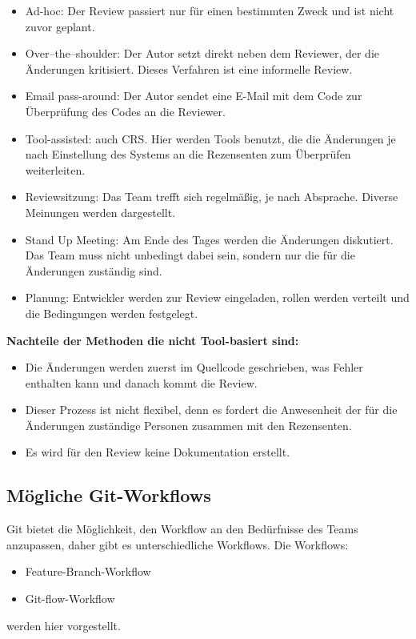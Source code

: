 \begin{itemize}
	\item Ad-hoc: Der Review passiert nur für einen bestimmten Zweck und ist nicht zuvor geplant.
	\item Over–the–shoulder: Der Autor setzt direkt neben dem Reviewer, der die Änderungen kritisiert. Dieses Verfahren ist eine informelle Review.
	\item Email pass-around: Der Autor sendet eine E-Mail mit dem Code zur Überprüfung des Codes an die Reviewer.
	\item Tool-assisted: auch \ac{CRS}. Hier werden Tools benutzt, die die Änderungen je nach Einstellung des Systems an die Rezensenten zum Überprüfen weiterleiten.
	\item Reviewsitzung: Das Team trefft sich regelmäßig, je nach Absprache. Diverse Meinungen werden dargestellt.
	\item Stand Up Meeting: Am Ende des Tages werden die Änderungen diskutiert. Das Team muss nicht unbedingt dabei sein, sondern nur die für die Änderungen zuständig sind.
	\item Planung: Entwickler werden zur Review eingeladen, rollen werden verteilt und die Bedingungen werden festgelegt.
\end{itemize}

\textbf{Nachteile der Methoden die nicht Tool-basiert sind:}
\begin{itemize}
	\item Die Änderungen werden zuerst im Quellcode geschrieben, was Fehler enthalten kann und danach kommt die Review.
	\item Dieser Prozess ist nicht flexibel, denn es fordert die Anwesenheit der für die Änderungen zuständige Personen zusammen mit den Rezensenten.
	\item Es wird für den Review keine Dokumentation erstellt.
\end{itemize}

\subsection{Mögliche Git-Workflows}
\label{sec:Git-Workflows}

Git bietet die Möglichkeit, den Workflow an den Bedürfnisse des Teams anzupassen, daher gibt es unterschiedliche Workflows.
Die Workflows:
\begin{itemize}
	\item Feature-Branch-Workflow
	\item Git-flow-Workflow
\end{itemize}
werden hier vorgestellt.

